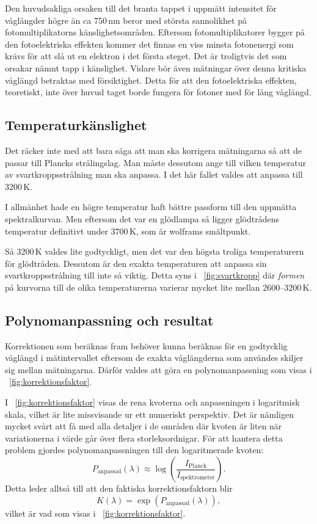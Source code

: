 \documentclass[11pt,a4paper]{article}
\newcommand{\figref}{\figurename~\ref}
\begin{document}
Den huvudsakliga orsaken till det branta tappet i uppmätt intensitet
för våglängder högre än ca 750\,nm beror med största sannolikhet på
fotomultiplikatorns känslighetsområden. Eftersom fotomultiplikatorer
bygger på den fotoelektriska effekten kommer det finnas en viss minsta
fotonenergi som krävs för att slå ut en elektron i det första
steget. Det är troligtvis det som orsakar nämnt tapp i
känslighet. Vidare bör även mätningar över denna kritiska våglängd
betraktas med försiktighet. Detta för att den fotoelektriska effekten,
teoretiskt, inte över huvud taget borde fungera för fotoner med för
lång våglängd. 


\subsection{Temperaturkänslighet}
Det räcker inte med att bara säga att man ska korrigera mätningarna
så att de passar till Plancks strålingslag. Man måste dessutom ange
till vilken temperatur av svartkroppsstrålning man ska anpassa. I det
här fallet valdes att anpassa till 3200\,K. 

I allmänhet hade en högre temperatur haft bättre passform till den
uppmätta spektralkurvan. Men eftersom det var en glödlampa så ligger
glödtrådens temperatur definitivt under 3700\,K, som är wolframs
smältpunkt. 

Så 3200\,K valdes lite godtyckligt, men det var den högsta troliga
temperaturern för glödtråden. Dessutom är den exakta temperaturen att
anpassa sin svartkroppsstrålning till inte så viktig. Detta syns i
\figref{fig:svartkropp} där \emph{formen} på kurvorna till de olika
temperaturerna varierar mycket lite mellan 2600--3200\,K. 


\subsection{Polynomanpassning och resultat}
Korrektionen som beräknas fram behöver kunna beräknas för en
godtycklig våglängd i mätintervallet eftersom de exakta våglängderna
som användes skiljer sig mellan mätningarna. Därför valdes att göra en
polynomanpassning som visas i \figref{fig:korrektionsfaktor}. 

I \figref{fig:korrektionsfaktor} visas de rena kvoterna och
anpassningen i logaritmisk skala, vilket är lite missvisande ur ett
numeriskt perspektiv. Det är nämligen mycket svårt att få med alla
detaljer i de områden där kvoten är liten när variationerna i värde
går över flera storleksordnigar. För att hantera detta problem gjordes
polynomanpassningen till den logaritmerade kvoten: 
\[
P_\text{anpassad} (\lambda) 
\approx \log(\frac{I_\text{Planck}}{I_\text{spektrometer}}).
\]
Detta leder alltså till att den faktiska korrektionsfaktorn blir
\[
K(\lambda) = \exp(P_\text{anpassad}(\lambda)),
\]
vilket är vad som visas i \figref{fig:korrektionsfaktor}.
\end{document}
